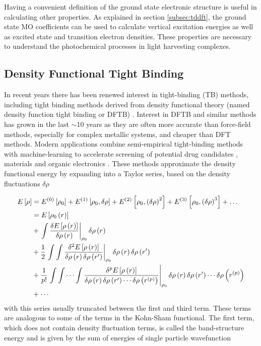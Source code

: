 Having a convenient definition of the ground state electronic structure is useful
in calculating other properties. As explained in section \ref{subsec:tddft}, the
ground state MO coefficients can be used to calculate vertical excitation energies
as well as excited state and transition electron densities. These properties are
necessary to understand the photochemical processes in light harvesting complexes.

\subsection{Density Functional Tight Binding}
\label{subsec:tight_binding}
In recent years there has been renewed interest in tight-binding (TB) methods, including
tight binding methods derived from density functional theory (named density function 
tight binding or DFTB) \cite{Porezag1994}. Interest in DFTB and similar methods 
has grown in the last $\sim$10 years as they are often more accurate than force-field
methods, especially for complex metallic systems, and cheaper than DFT methods. 
Modern applications combine semi-empirical tight-binding methods with machine-learning
to accelerate screening of potential drug candidates \cite{Qiao2020}, materials 
\cite{Hegde2017} and organic electronics \cite{Omar2021}. These methods approximate 
the density functional energy by expanding into a Taylor series, based on the density
fluctuations $\delta\rho$

\begin{equation}
    \begin{split}
    E\left[\rho\right] &= E^{\left(0\right)}\left[\rho_0\right] + E^{\left(1\right)}\left[\rho_0, \delta\rho\right] + E^{\left(2\right)}\left[\rho_0, \left(\delta\rho\right)^2\right] + E^{\left(3\right)}\left[\rho_0, \left(\delta\rho\right)^3\right] + \dots \\
    &= E_{} \left[ \rho_0\left(r\right) \right] \\
    &+ \left. \int \frac{\delta E_{} \left[ \rho\left(r\right) \right]}{\delta \rho\left(r\right)} \right\rvert_{\rho_0}  \delta \rho \left( r \right) \\
    &+ \frac{1}{2} \left. \int\int \frac{\delta^2 E_{} \left[ \rho\left(r\right) \right]}{\delta \rho\left(r\right)\delta \rho\left(r^\prime\right)} \right\rvert_{\rho_0} \delta \rho \left( r \right) \delta \rho \left( r^\prime \right) \\
    &+ \frac{1}{p!} \left. \int\int \cdots\int \frac{\delta^p E_{} \left[ \rho\left(r\right) \right]}{\delta \rho\left(r\right)\delta \rho\left(r^\prime\right) \cdots \delta \rho\left(r^{\left(p\right)}\right)} \right\rvert_{\rho_0} \delta \rho \left( r \right) \delta \rho \left( r^\prime \right) \cdots \delta \rho\left(r^{\left(p\right)}\right) \\
    &+ \cdots
    \end{split}
\end{equation}
%
with this series usually truncated between the first and third term\cite{Gaus2011, Koskinen2009}. 
These terms are analogous to some of the terms in the Kohn-Sham functional. The 
first term, which does not contain density fluctuation terms, is called the band-structure
energy and is given by the sum of energies of single particle wavefunction

